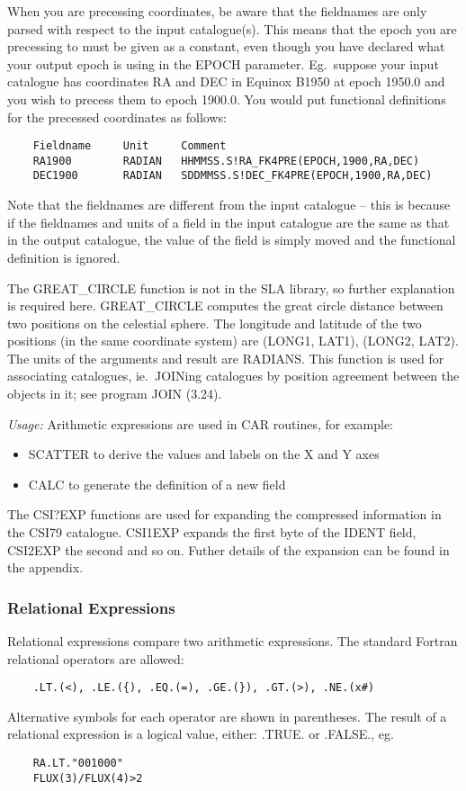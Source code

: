 \begin{description}
When you are precessing coordinates, be aware that the fieldnames are only
parsed with respect to the input catalogue(s).
This means that the epoch you are precessing to must be given as a constant,
even though you have declared what your output epoch is using in the EPOCH
parameter.
Eg.\ suppose your input catalogue has coordinates RA and DEC in Equinox B1950 at
epoch 1950.0 and you wish to precess them to epoch 1900.0.
You would put functional definitions for the precessed coordinates as follows:
\begin{verbatim}
    Fieldname     Unit     Comment
    RA1900        RADIAN   HHMMSS.S!RA_FK4PRE(EPOCH,1900,RA,DEC)
    DEC1900       RADIAN   SDDMMSS.S!DEC_FK4PRE(EPOCH,1900,RA,DEC)
\end{verbatim}
Note that the fieldnames are different from the input catalogue -- this is because
if the fieldnames and units of a field in the input catalogue are the same as
that in the output catalogue, the value of the field is simply moved and the
functional definition is ignored.

The GREAT\_CIRCLE function is not in the SLA library, so further explanation is
required here.
GREAT\_CIRCLE computes the great circle distance between two positions on the
celestial sphere.
The longitude and latitude of the two positions (in the same coordinate system)
are (LONG1, LAT1), (LONG2, LAT2).
The units of the arguments and result are RADIANS.
This function is used for associating catalogues, ie.\ JOINing catalogues by
position agreement between the objects in it; see program JOIN (3.24).

{\em Usage:} Arithmetic expressions are used in CAR routines, for example:
\begin{itemize}
\item SCATTER to derive the values and labels on the X and Y axes
\item CALC to generate the definition of a new field
\end{itemize}

The CSI?EXP functions are used for expanding the compressed information in
the CSI79 catalogue. CSI1EXP expands the first byte of the IDENT field, CSI2EXP
the second and so on. Futher details of the expansion can be found in the
appendix.

\end{description}
\subsubsection {Relational Expressions}
Relational expressions compare two arithmetic expressions.
The standard Fortran relational operators are allowed:
\begin{verbatim}
    .LT.(<), .LE.({), .EQ.(=), .GE.(}), .GT.(>), .NE.(x#)
\end{verbatim}
Alternative symbols for each operator are shown in parentheses.
The result of a relational expression is a logical value, either: .TRUE.
or .FALSE., eg.\
\begin{verbatim}
    RA.LT."001000"
    FLUX(3)/FLUX(4)>2
\end{verbatim}
